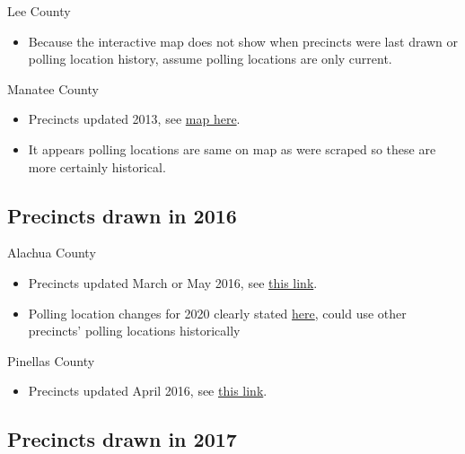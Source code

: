 \documentclass[12pt]{article}
\begin{document}
Lee County
\begin{itemize}
  \item Because the interactive map does not show when precincts were last drawn or polling location history, assume polling locations are only current.
\end{itemize}
Manatee County
\begin{itemize}
  \item Precincts updated 2013, see \href{https://www.votemanatee.com/portals/manatee/documents/pct2013.pdf}{map here}.
  \item It appears polling locations are same on map as were scraped so these are more certainly historical.
\end{itemize}

\clearpage

\subsection{Precincts drawn in 2016}

Alachua County
\begin{itemize}
  \item Precincts updated March or May 2016, see \href{https://www.votealachua.com/Elections/Maps}{this link}.
  \item Polling location changes for 2020 clearly stated \href{https://www.votealachua.com/Voters/Precinct-Voting}{here}, could use other precincts' polling locations historically
\end{itemize}
Pinellas County
\begin{itemize}
  \item Precincts updated April 2016, see \href{https://www.votepinellas.com/General-Information/Maps/District-Maps}{this link}.
\end{itemize}



\clearpage

\subsection{Precincts drawn in 2017}
\end{document}
